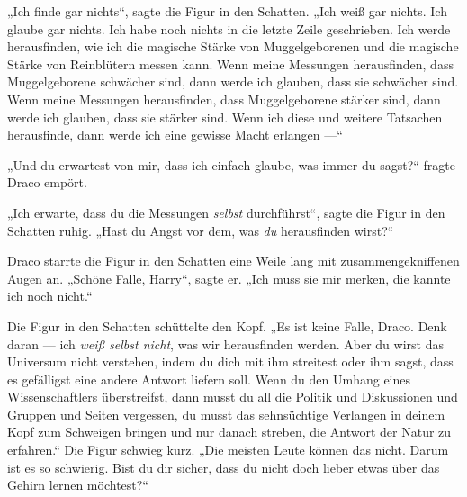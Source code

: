 „Ich finde gar nichts“, sagte die Figur in den Schatten.
„Ich weiß gar nichts. Ich glaube gar nichts. Ich habe noch nichts in die letzte Zeile geschrieben. Ich werde herausfinden, wie ich die magische Stärke von Muggelgeborenen und die magische Stärke von Reinblütern messen kann. Wenn meine Messungen herausfinden, dass Muggelgeborene schwächer sind, dann werde ich glauben, dass sie schwächer sind. Wenn meine Messungen herausfinden, dass Muggelgeborene stärker sind, dann werde ich glauben, dass sie stärker sind. Wenn ich diese und weitere Tatsachen herausfinde, dann werde ich eine gewisse Macht erlangen —“

„Und du erwartest von mir, dass ich einfach glaube, was immer du sagst?“ fragte Draco empört.

„Ich erwarte, dass du die Messungen \emph{selbst} durchführst“, sagte die Figur in den Schatten ruhig.
„Hast du Angst vor dem, was \emph{du} herausfinden wirst?“

Draco starrte die Figur in den Schatten eine Weile lang mit zusammengekniffenen Augen an.
„Schöne Falle, Harry“, sagte er.
„Ich muss sie mir merken, die kannte ich noch nicht.“

Die Figur in den Schatten schüttelte den Kopf.
„Es ist keine Falle, Draco. Denk daran — ich \emph{weiß selbst nicht}, was wir herausfinden werden. Aber du wirst das Universum nicht verstehen, indem du dich mit ihm streitest oder ihm sagst, dass es gefälligst eine andere Antwort liefern soll. Wenn du den Umhang eines Wissenschaftlers überstreifst, dann musst du all die Politik und Diskussionen und Gruppen und Seiten vergessen, du musst das sehnsüchtige Verlangen in deinem Kopf zum Schweigen bringen und nur danach streben, die Antwort der Natur zu erfahren.“ Die Figur schwieg kurz.
„Die meisten Leute können das nicht. Darum ist es so schwierig. Bist du dir sicher, dass du nicht doch lieber etwas über das Gehirn lernen möchtest?“


